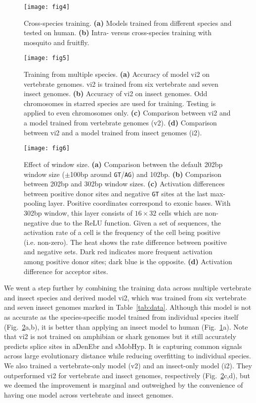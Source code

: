 \documentclass[webpdf,contemporary,large,namedate]{oup-authoring-template}%
\begin{document}
\begin{figure}[bt]
\texttt{[image: fig4]}
\caption{Cross-species training.
{\bf (a)} Models trained from different species and tested on human.
{\bf (b)} Intra- versus cross-species training with mosquito and fruitfly.}\label{fig:4}
\end{figure}

\begin{figure}[tb]
\texttt{[image: fig5]}
\caption{Training from multiple species.
{\bf (a)} Accuracy of model vi2 on vertebrate genomes. vi2 is trained from six vertebrate and seven insect genomes.
{\bf (b)} Accuracy of vi2 on insect genomes. Odd chromosomes in starred species are used for training.
Testing is applied to even chromosomes only.
{\bf (c)} Comparison between vi2 and a model trained from vertebrate genomes (v2).
{\bf (d)} Comparison between vi2 and a model trained from insect genomes (i2).}\label{fig:5}
\end{figure}

\begin{figure}[bt]
\texttt{[image: fig6]}
\caption{Effect of window size.
{\bf (a)} Comparison between the default 202bp window size ($\pm$100bp around {\tt GT}/{\tt AG}) and 102bp.
{\bf (b)} Comparison between 202bp and 302bp window sizes.
{\bf (c)} Activation differences between positive donor sites and negative {\tt GT} sites at the last max-pooling layer.
Positive coordinates correspond to exonic bases.
With 302bp window, this layer consists of $16\times32$ cells which are non-negative due to the ReLU function.
Given a set of sequences, the activation rate of a cell is the frequency of the cell being positive (i.e. non-zero).
The heat shows the rate difference between positive and negative sets.
Dark red indicates more frequent activation among positive donor sites; dark blue is the opposite.
{\bf (d)} Activation difference for acceptor sites.}\label{fig:6}
\end{figure}

We went a step further by combining the training data across multiple vertebrate and insect species
and derived model vi2, which was trained from six vertebrate and seven insect genomes marked in Table~\ref{tab:data}.
Although this model is not as accurate as the species-specific model trained from individual species itself (Fig.~\ref{fig:5}a,b),
it is better than applying an insect model to human (Fig.~\ref{fig:4}a).
Note that vi2 is not trained on amphibian or shark genomes but it still accurately predicts splice sites in aDenEbr and sMobHyp.
It is capturing common signals across large evolutionary distance while reducing overfitting to individual species.
We also trained a vertebrate-only model (v2) and an insect-only model (i2).
They outperformed vi2 for vertebrate and insect genomes, respectively (Fig.~\ref{fig:5}c,d),
but we deemed the improvement is marginal and outweighed by the convenience
of having one model across vertebrate and insect genomes.
\end{document}
